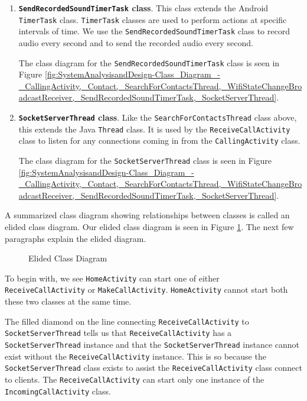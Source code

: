 \documentclass[12pt,svgnames,smaller]{article} %
\begin{document}
\begin{enumerate}
		\item \textbf{\texttt{SendRecordedSoundTimerTask} class}. This class extends the Android \texttt{TimerTask} class. \texttt{TimerTask} classes are used to perform actions at specific intervals of time. We use the \texttt{SendRecordedSoundTimerTask} class to record audio every second and to send the recorded audio every second.
		
		The class diagram for the \texttt{SendRecordedSoundTimerTask} class is seen in Figure \ref{fig:SystemAnalysisandDesign-Class_Diagram_-_CallingActivity,_Contact,_SearchForContactsThread,_WifiStateChangeBroadcastReceiver,_SendRecordedSoundTimerTask,_SocketServerThread}.
		
		\item \textbf{\texttt{SocketServerThread} class}. Like the \texttt{SearchForContactsThread} class above, this extends the Java \texttt{Thread} class. It is used by the \texttt{ReceiveCallActivity} class to listen for any connections coming in from the \texttt{CallingActivity} class. 
		
		The class diagram for the \texttt{SocketServerThread} class is seen in Figure \ref{fig:SystemAnalysisandDesign-Class_Diagram_-_CallingActivity,_Contact,_SearchForContactsThread,_WifiStateChangeBroadcastReceiver,_SendRecordedSoundTimerTask,_SocketServerThread}.
		
	\end{enumerate}
	
	A summarized class diagram showing relationships between classes is called an elided class diagram. Our elided class diagram is seen in Figure \ref{fig:SystemAnalysisandDesign-Class_Diagram_-_Elided}. The next few paragraphs explain the elided diagram.
	
	\begin{figure}
		\centering
		\caption{Elided Class Diagram}%
		\label{fig:SystemAnalysisandDesign-Class_Diagram_-_Elided}
	\end{figure}
	
	To begin with, we see \texttt{HomeActivity} can start one of either \texttt{ReceiveCallActivity} or \texttt{MakeCallActivity}. \texttt{HomeActivity} cannot start both these two classes at the same time.
	
	The filled diamond on the line connecting \texttt{ReceiveCallActivity} to \texttt{SocketServerThread} tells us that \texttt{ReceiveCallActivity} has a \texttt{SocketServerThread} instance and that the \texttt{SocketServerThread} instance cannot exist without the \texttt{ReceiveCallActivity} instance. This is so because the \texttt{SocketServerThread} class exists to assist the \texttt{ReceiveCallActivity} class connect to clients. The \texttt{ReceiveCallActivity} can start only one instance of the \texttt{IncomingCallActivity} class.
	
\end{document}
